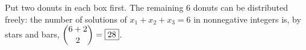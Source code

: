 Put two donuts in each box first. The remaining $6$ donuts can be distributed freely: the number of solutions of $x_1+x_2+x_3=6$ in nonnegative integers is, by stars and bars, $\dbinom{6+2}{2}=\boxed{28}$.
